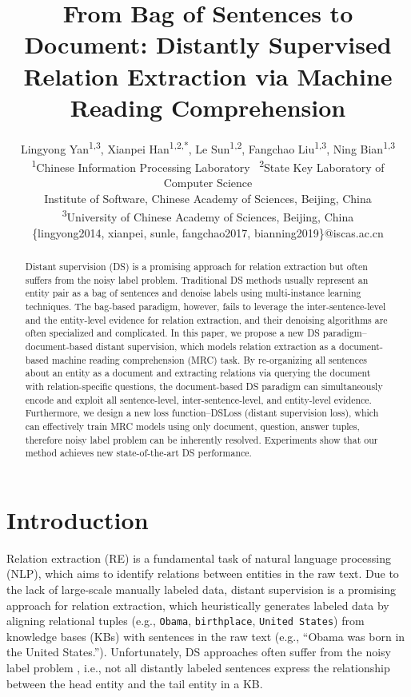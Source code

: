 \documentclass[11pt,a4paper]{article}
\title{From Bag of Sentences to Document: Distantly Supervised Relation Extraction via Machine Reading Comprehension}
\author{
  Lingyong Yan\textsuperscript{\rm 1,3},
  Xianpei Han\textsuperscript{\rm 1,2,*},
  Le Sun\textsuperscript{\rm 1,2},
  Fangchao Liu\textsuperscript{\rm 1,3},
  Ning Bian\textsuperscript{\rm 1,3}\\
  \textsuperscript{\rm 1}Chinese Information Processing Laboratory \ 
  \textsuperscript{\rm 2}State Key Laboratory of Computer Science\\
  Institute of Software, Chinese Academy of Sciences, Beijing, China\\
  \textsuperscript{\rm 3}University of Chinese Academy of Sciences, Beijing, China\\
  \{lingyong2014, xianpei, sunle, fangchao2017, bianning2019\}@iscas.ac.cn
}
\date{}
\begin{document}
\maketitle
\begin{abstract}
  Distant supervision (DS) is a promising approach for relation extraction but often suffers from the noisy label problem. Traditional DS methods usually represent an entity pair as a bag of sentences and denoise labels using multi-instance learning techniques.
  The bag-based paradigm, however, fails to leverage the inter-sentence-level and the entity-level evidence for relation extraction, and their denoising algorithms are often specialized and complicated.
  In this paper, we propose a new DS paradigm--document-based distant supervision, which models relation extraction as a document-based machine reading comprehension (MRC) task.
  By re-organizing all sentences about an entity as a document and extracting relations via querying the document with relation-specific questions, the document-based DS paradigm can simultaneously encode and exploit all sentence-level, inter-sentence-level, and entity-level evidence.
  Furthermore,  we design a new loss function--DSLoss (distant supervision loss), which can effectively train MRC models using only document, question, answer tuples, therefore noisy label problem can be inherently resolved.
  Experiments show that our method achieves new state-of-the-art DS performance.
  \end{abstract}
  
  \section{Introduction}
  Relation extraction (RE) is a fundamental task of natural language processing (NLP), which aims to identify relations between entities in the raw text.
  Due to the lack of large-scale manually labeled data, distant supervision\cite{mintz_distant_2009,hoffmann_knowledgebased_2011} is a promising approach for relation extraction, which heuristically generates labeled data by aligning relational tuples (e.g., \texttt{Obama}, \texttt{birthplace}, \texttt{United States}) from knowledge bases (KBs) with sentences in the raw text (e.g., ``Obama was born in the United States.'').
  Unfortunately, DS approaches often suffer from the noisy label problem \cite{riedel_modeling_2010,hoffmann_knowledgebased_2011,zeng_distant_2015}, i.e., not all distantly labeled sentences express the relationship between the head entity and the tail entity in a KB.
  
\end{document}
